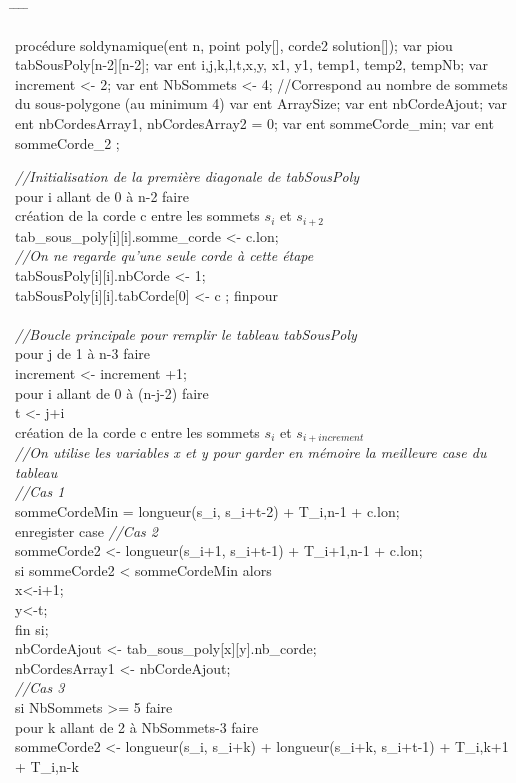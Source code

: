\documentclass[a4paper,10pt]{article}
\begin{document}
  
\begin{tabbing}
\hspace{0.5cm} \= \hspace{0.5cm}  \= \hspace{0.5cm} \= \hspace{0.5cm} \= \kill

procédure soldynamique(ent n, point poly[], corde2 solution[]);
var piou tabSousPoly[n-2][n-2];
var ent i,j,k,l,t,x,y, x1, y1,  temp1, temp2, tempNb;
var increment <- 2;
var ent NbSommets <- 4; //Correspond au nombre de sommets du sous-polygone (au minimum 4)
var ent ArraySize;
var ent  nbCordeAjout;	
var ent nbCordesArray1, nbCordesArray2 = 0;
var ent sommeCorde_min;
var ent sommeCorde_2 ;

\textit{//Initialisation de la première diagonale de tabSousPoly}\\
pour i allant de 0 à n-2 faire\\
  \> création de la corde c entre les sommets \(s_i\) et \(s_{i+2}\) \\
  \> tab_sous_poly[i][i].somme_corde <- c.lon; \\
  \> \textit{//On ne regarde qu'une seule corde à cette étape} \\
  \> tabSousPoly[i][i].nbCorde <- 1; \\
  \> tabSousPoly[i][i].tabCorde[0] <- c ;
finpour\\
\\
\textit{//Boucle principale pour remplir le tableau tabSousPoly }\\
pour j de 1 à n-3 faire\\
    \> increment <- increment +1;\\ 
    \> pour i allant de 0 à (n-j-2) faire\\
        \> \> t <- j+i\\
	\> \> création de la corde c entre les sommets \(s_i\) et \(s_{i+increment}\) \\
	\> \> \textit{//On utilise les variables x et y pour garder en mémoire la meilleure case du tableau }\\  
	\> \> \textit{//Cas 1} \\
	\> \> sommeCordeMin = longueur(s_i, s_{i+t-2}) + T_{i,n-1} + c.lon; \\
	\> \> enregister case
	\> \> \textit{//Cas 2} \\
	\> \> sommeCorde2 <- longueur(s_{i+1}, s_{i+t-1}) + T_{i+1,n-1} + c.lon; \\
	\> \> si sommeCorde2 < sommeCordeMin alors \\
	  \> \> \> x<-i+1; \\
	  \> \> \> y<-t; \\
	\> \> fin si; \\
	\> \> nbCordeAjout <- tab_sous_poly[x][y].nb_corde; \\
	\> \> nbCordesArray1 <- nbCordeAjout; \\
	\> \> \textit{//Cas 3} \\
	\> \> si NbSommets >= 5 faire \\
	  \> \> \> pour k allant de 2 à NbSommets-3 faire \\
	  \> \> \> \>  sommeCorde2 <- longueur(s_i, s_{i+k}) + longueur(s_{i+k}, s_{i+t-1}) + T_{i,k+1} + T_{i,n-k}


\end{tabbing}
\end{document}
